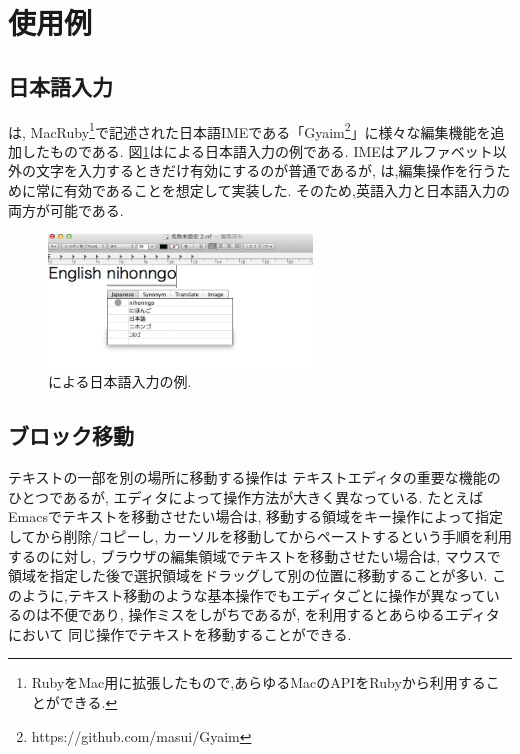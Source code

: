 \section{{\system}使用例}


\subsection{日本語入力}

{\system}は,
MacRuby\footnote{
  RubyをMac用に拡張したもので,あらゆるMacのAPIをRubyから利用することができる.
}で記述された日本語IMEである「Gyaim\footnote{
 \textsf{https://github.com/masui/Gyaim}
}」に様々な編集機能を追加したものである.
%
図\ref{japaneseinput}は{\system}による日本語入力の例である.
IMEはアルファベット以外の文字を入力するときだけ有効にするのが普通であるが,
{\system}は,編集操作を行うために常に有効であることを想定して実装した.
そのため,英語入力と日本語入力の両方が可能である.

\begin{figure}[H]
\centerline{\includegraphics[width=70mm,bb=0 0 600 320]{figures/japanese.png}}
\caption{{\system}による日本語入力の例.}
\label{japaneseinput}
\end{figure}

\subsection{ブロック移動}

テキストの一部を別の場所に移動する操作は
テキストエディタの重要な機能のひとつであるが,
エディタによって操作方法が大きく異なっている.
たとえばEmacsでテキストを移動させたい場合は,
移動する領域をキー操作によって指定してから削除/コピーし,
カーソルを移動してからペーストするという手順を利用するのに対し,
ブラウザの編集領域でテキストを移動させたい場合は,
マウスで領域を指定した後で選択領域をドラッグして別の位置に移動することが多い.
このように,テキスト移動のような基本操作でもエディタごとに操作が異なっているのは不便であり,
操作ミスをしがちであるが,
{\system}を利用するとあらゆるエディタにおいて
同じ操作でテキストを移動することができる.

